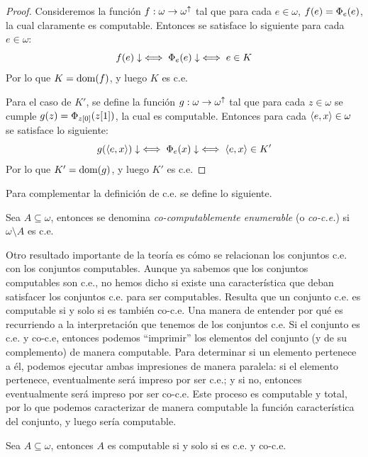 \begin{proof}
	Consideremos la función $f:\omega\to\omega^{\DIVERGE}$ tal que para cada $e\in\omega$, $f\pa*{e} =\Phi_{e}\pa*{e}$, la cual claramente es computable. Entonces se satisface lo siguiente para cada $e\in\omega$:
	\[
		f\pa*{e}\ACABA\iff\Phi_{e}\pa*{e}\ACABA\iff e\in K
	\]
	Por lo que $K =\DOMINIO{f}$, y luego $K$ es c.e.

	Para el caso de $K'$, se define la función $g:\omega\to\omega^{\DIVERGE}$ tal que para cada $z\in\omega$ se cumple $g\pa*{z} =\Phi_{z\bra*{0}}\pa*{z\bra*{1}}$, la cual es computable. Entonces para cada $\inner*{e, x}\in\omega$ se satisface lo siguiente:
	\[
		g\pa*{\inner*{e, x}}\ACABA\iff\Phi_{e}\pa*{x}\ACABA\iff\inner*{e, x}\in K'
	\]
	Por lo que $K' =\DOMINIO{g}$, y luego $K'$ es c.e.
\end{proof}

Para complementar la definición de c.e. se define lo siguiente.

\begin{definition}
	Sea $A\subseteq\omega$, entonces se denomina \emph{co-computablemente enumerable} (o \emph{co-c.e.}) si $\omega\setminus A$ es c.e.
\end{definition}

Otro resultado importante de la teoría es cómo se relacionan los conjuntos c.e. con los conjuntos computables. Aunque ya sabemos que los conjuntos computables son c.e., no hemos dicho si existe una característica que deban satisfacer los conjuntos c.e. para ser computables. Resulta que un conjunto c.e. es computable si y solo si es también co-c.e. Una manera de entender por qué es recurriendo a la interpretación que tenemos de los conjuntos c.e. Si el conjunto es c.e. y co-c.e, entonces podemos ``imprimir'' los elementos del conjunto (y de su complemento) de manera computable. Para determinar si un elemento pertenece a él, podemos ejecutar ambas impresiones de manera paralela: si el elemento pertenece, eventualmente será impreso por ser c.e.; y si no, entonces eventualmente será impreso por ser co-c.e. Este proceso es computable y total, por lo que podemos caracterizar de manera computable la función característica del conjunto, y luego sería computable.

\begin{theorem}
	\label{theo: caracterizacion_computables} %
	Sea $A\subseteq\omega$, entonces $A$ es computable si y solo si es c.e. y co-c.e.
\end{theorem}

